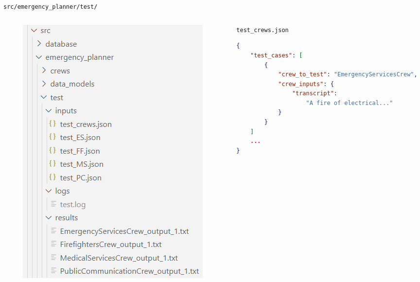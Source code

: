 \begin{frame}[fragile]{\texttt{src/emergency\_planner/test/}}
    \begin{columns}
        \begin{column}{0.33\textwidth}
            \begin{figure}
                \includegraphics[width=\textwidth]{figures/test_folder_structure.png}
            \end{figure}
        \end{column}
        \begin{column}{0.67\textwidth}
            \centering
            \texttt{test\_crews.json}
            \begin{lstlisting}[language=json]
{
    "test_cases": [
        {
            "crew_to_test": "EmergencyServicesCrew",
            "crew_inputs": {
                "transcript": 
                    "A fire of electrical..."
            }
        }
    ]
    ...
}    
            \end{lstlisting}
        \end{column}
    \end{columns}
\end{frame}